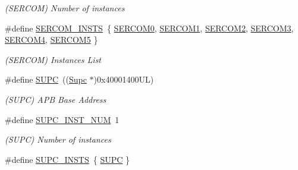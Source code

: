 \begin{DoxyCompactItemize}
\begin{DoxyCompactList}\small\item\em (S\+E\+R\+C\+O\+M) Number of instances \end{DoxyCompactList}\item 
\hypertarget{group___s_a_m_l21_g18_a__base_gadb03dbe1ef2a3400f0a16b58948053a7}{}\#define \hyperlink{group___s_a_m_l21_g18_a__base_gadb03dbe1ef2a3400f0a16b58948053a7}{S\+E\+R\+C\+O\+M\+\_\+\+I\+N\+S\+T\+S}~\{ \hyperlink{group___s_a_m_l21_j18_a__base_gae5473788457bad0e69ad9d7f22ed404f}{S\+E\+R\+C\+O\+M0}, \hyperlink{group___s_a_m_l21_j18_a__base_ga130d7d7bc9ef1da1ba1bd094b42449d7}{S\+E\+R\+C\+O\+M1}, \hyperlink{group___s_a_m_l21_j18_a__base_ga918e4c85993961a115bb23b4bb73a87f}{S\+E\+R\+C\+O\+M2}, \hyperlink{group___s_a_m_l21_j18_a__base_gac9f8240be5a40b46cb09617323ebc7e3}{S\+E\+R\+C\+O\+M3}, \hyperlink{group___s_a_m_l21_j18_a__base_gad48343faa88820b8f552aa1eaf66f00a}{S\+E\+R\+C\+O\+M4}, \hyperlink{group___s_a_m_l21_j18_a__base_ga8785a316e608cb0a218f2a59655d6037}{S\+E\+R\+C\+O\+M5} \}\label{group___s_a_m_l21_g18_a__base_gadb03dbe1ef2a3400f0a16b58948053a7}

\begin{DoxyCompactList}\small\item\em (S\+E\+R\+C\+O\+M) Instances List \end{DoxyCompactList}\item 
\hypertarget{group___s_a_m_l21_g18_a__base_ga7318f2eec4a4b784dc63e9364887faa1}{}\#define \hyperlink{group___s_a_m_l21_g18_a__base_ga7318f2eec4a4b784dc63e9364887faa1}{S\+U\+P\+C}~((\hyperlink{struct_supc}{Supc}     $\ast$)0x40001400\+U\+L)\label{group___s_a_m_l21_g18_a__base_ga7318f2eec4a4b784dc63e9364887faa1}

\begin{DoxyCompactList}\small\item\em (S\+U\+P\+C) A\+P\+B Base Address \end{DoxyCompactList}\item 
\hypertarget{group___s_a_m_l21_g18_a__base_ga9715ea8328768e4ecb431a17cc2ef464}{}\#define \hyperlink{group___s_a_m_l21_g18_a__base_ga9715ea8328768e4ecb431a17cc2ef464}{S\+U\+P\+C\+\_\+\+I\+N\+S\+T\+\_\+\+N\+U\+M}~1\label{group___s_a_m_l21_g18_a__base_ga9715ea8328768e4ecb431a17cc2ef464}

\begin{DoxyCompactList}\small\item\em (S\+U\+P\+C) Number of instances \end{DoxyCompactList}\item 
\hypertarget{group___s_a_m_l21_g18_a__base_ga195e0d4101c701b562e4af9e8c2a522b}{}\#define \hyperlink{group___s_a_m_l21_g18_a__base_ga195e0d4101c701b562e4af9e8c2a522b}{S\+U\+P\+C\+\_\+\+I\+N\+S\+T\+S}~\{ \hyperlink{group___s_a_m_l21_j18_a__base_ga7318f2eec4a4b784dc63e9364887faa1}{S\+U\+P\+C} \}\label{group___s_a_m_l21_g18_a__base_ga195e0d4101c701b562e4af9e8c2a522b}


\end{DoxyCompactItemize}
